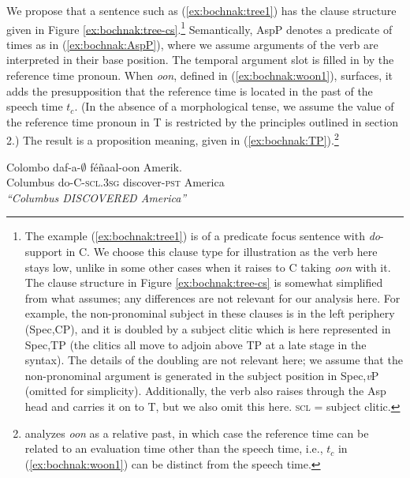 \documentclass[output=paper]{langsci/langsci}
\begin{document}
We propose that a sentence such as (\ref{ex:bochnak:tree1}) has the clause
structure given in Figure \ref{ex:bochnak:tree-cs}.\footnote{The example
  (\ref{ex:bochnak:tree1}) is of a predicate focus sentence with
  \textit{do}-support in C. We choose this clause type for
  illustration as the verb here stays low, unlike in some other cases
  when it raises to C taking \textit{oon} with it. The clause structure
 in Figure \ref{ex:bochnak:tree-cs} is somewhat simplified from what \cite{Martinovic2015b} assumes; any
differences are not relevant for our analysis here. For example, the
non-pronominal subject in these clauses is in the left periphery
(Spec,CP), and it is doubled by a subject clitic which is here
represented in Spec,TP (the clitics all move to adjoin above TP at a
late stage in the syntax). The details of the doubling are not
relevant here; we assume that the non-pronominal argument is generated
in the subject position in Spec,\textit{v}P (omitted for simplicity). Additionally, the verb also
raises through the Asp head and carries it on to T, but we also omit this
here. \textsc{scl} = subject clitic.} Semantically, AspP denotes a predicate of times as in (\ref{ex:bochnak:AspP}), where we assume arguments of the verb are interpreted in their base position. The temporal argument slot is filled in by the reference time pronoun. When  \textit{oon}, defined in (\ref{ex:bochnak:woon1}), surfaces, it adds the presupposition that the reference time is located in the past of the speech time $t_c$. (In the absence of a morphological tense, we assume the value of the reference time pronoun in T is restricted by the principles outlined in section 2.) The result is a proposition meaning, given in (\ref{ex:bochnak:TP}).\footnote{\citet{robert91approche} analyzes \textit{oon} as a relative past, in which case the reference time can be related to an evaluation time other than the speech time, i.e., $t_c$ in (\ref{ex:bochnak:woon1}) can be distinct from the speech time.}

\ea\label{ex:bochnak:tree1} \gll Colombo daf-a-$\emptyset$ f\'e\~naal-oon Amerik.\\
Columbus do-C-\textsc{scl.3sg} discover-\textsc{pst} America\\
\glt\textit{``Columbus DISCOVERED America''}
\z

\end{document}
